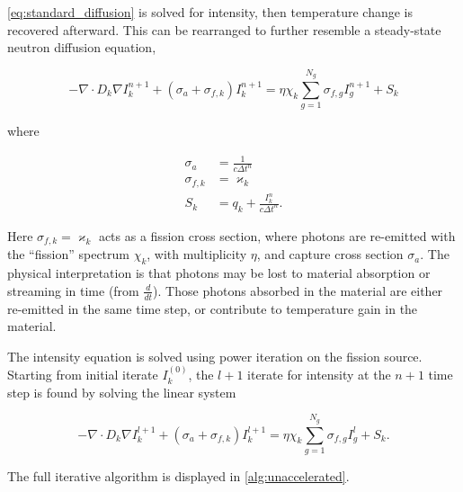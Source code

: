 \documentclass{template}
\begin{document}
\autoref{eq:standard_diffusion} is solved for intensity, then temperature change is recovered afterward. This can be rearranged to further resemble a steady-state neutron diffusion equation,

    \begin{equation}
  \label{eq:neutron_diffusion}-\nabla \cdot D_k \nabla I_k^{n+1} + \left( \sigma_a + \sigma_{f, k} \right)I_k^{n+1} = \eta \chi_k \sum_{g=1}^{N_g}\sigma_{f, g}I_g^{n+1} + S_k
    \end{equation}

where

\begin{subequations}\label{eq:neutron_xs}
  \begin{align}
  \sigma_a     &= \frac{1}{c\Delta t^n}\\
  \sigma_{f, k} &= \varkappa_k\\
  S_k &= q_k + \frac{I_k^n}{c\Delta t^n}.
\end{align}
\end{subequations}

Here $\sigma_{f, k} = \varkappa_k$ acts as a fission cross section, where photons are re-emitted with the ``fission'' spectrum $\chi_k$, with multiplicity $\eta$, and capture cross section $\sigma_a$. The physical interpretation is that photons may be lost to material absorption or streaming in time (from $\frac{d}{dt}$). Those photons absorbed in the material are either re-emitted in the same time step, or contribute to temperature gain in the material.

The intensity equation is solved using power iteration on the fission source. Starting from initial iterate $I_k^{(0)}$, the $l+1$ iterate for intensity at the $n+1$ time step is found by solving the linear system

\begin{equation}\label{eq:iterative_neutron}
  -\nabla \cdot D_k \nabla I_k^{l+1} + \left( \sigma_a + \sigma_{f, k} \right)I_k^{l+1} = \eta \chi_k \sum_{g=1}^{N_g}\sigma_{f, g}I_g^l + S_k.
\end{equation}

The full iterative algorithm is displayed in \autoref{alg:unaccelerated}.
\end{document}
